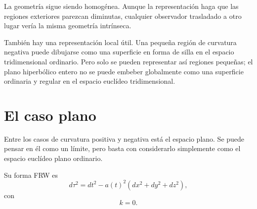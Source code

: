 La geometría sigue siendo homogénea. Aunque la representación haga que las regiones exteriores parezcan diminutas, cualquier observador trasladado a otro lugar vería la misma geometría intrínseca.

\begin{classroomqa}
\end{classroomqa}

\begin{classroomqa}
\end{classroomqa}

\begin{classroomqa}
\end{classroomqa}

También hay una representación local útil. Una pequeña región de curvatura negativa puede dibujarse como una superficie en forma de silla en el espacio tridimensional ordinario. Pero solo se pueden representar así regiones pequeñas; el plano hiperbólico entero no se puede embeber globalmente como una superficie ordinaria y regular en el espacio euclídeo tridimensional.

\section{El caso plano}

Entre los casos de curvatura positiva y negativa está el espacio plano. Se puede pensar en él como un límite, pero basta con considerarlo simplemente como el espacio euclídeo plano ordinario.

Su forma FRW es
\begin{equation}
d\tau^2=dt^2-a(t)^2\left(dx^2+dy^2+dz^2\right),
\end{equation}
con
\begin{equation}
k=0.
\end{equation}


